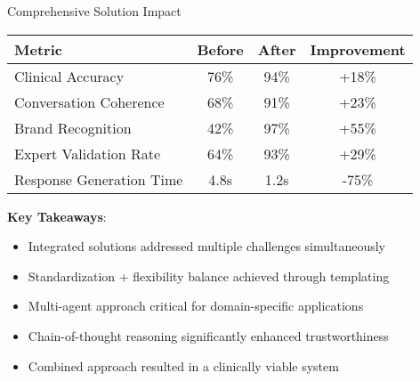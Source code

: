       

\begin{frame}{Comprehensive Solution Impact}
  \begin{center}
    \begin{tabular}{|l|c|c|c|}
      \hline
      \textbf{Metric} & \textbf{Before} & \textbf{After} & \textbf{Improvement} \\
      \hline
      Clinical Accuracy & 76\% & 94\% & +18\% \\
      Conversation Coherence & 68\% & 91\% & +23\% \\
      Brand Recognition & 42\% & 97\% & +55\% \\
      Expert Validation Rate & 64\% & 93\% & +29\% \\
      Response Generation Time & 4.8s & 1.2s & -75\% \\
      \hline
    \end{tabular}
  \end{center}
  
  \vspace{0.5cm}
  
  \textbf{Key Takeaways}:
  \begin{itemize}
    \item Integrated solutions addressed multiple challenges simultaneously
    \item Standardization + flexibility balance achieved through templating
    \item Multi-agent approach critical for domain-specific applications
    \item Chain-of-thought reasoning significantly enhanced trustworthiness
    \item Combined approach resulted in a clinically viable system
  \end{itemize}
\end{frame}